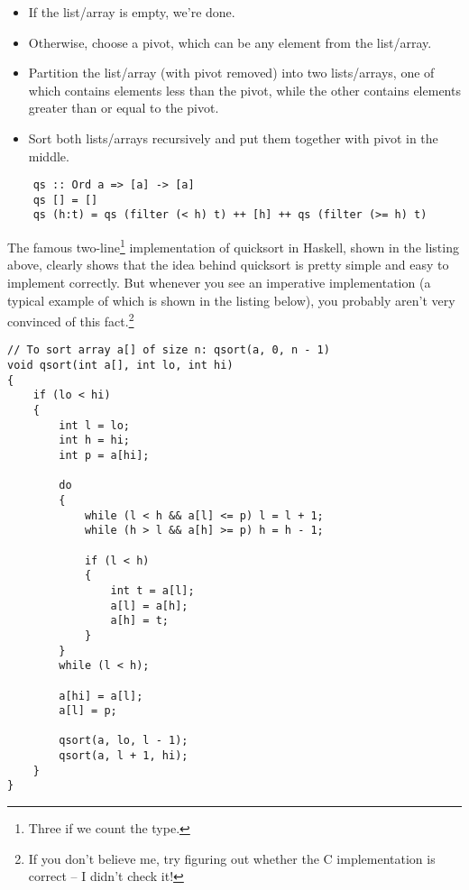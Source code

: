 \documentclass[declaration,mgr,english,shortabstract]{iithesis}
\begin{document}
\begin{itemize}
    \item If the list/array is empty, we're done.
    \item Otherwise, choose a pivot, which can be any element from the list/array.
    \item Partition the list/array (with pivot removed) into two lists/arrays, one of which contains elements less than the pivot, while the other contains elements greater than or equal to the pivot.
    \item Sort both lists/arrays recursively and put them together with pivot in the middle.
\end{itemize}

\begin{verbatim}
    qs :: Ord a => [a] -> [a]
    qs [] = []
    qs (h:t) = qs (filter (< h) t) ++ [h] ++ qs (filter (>= h) t)
\end{verbatim}

The famous two-line\footnote{Three if we count the type.} implementation of quicksort in Haskell, shown in the listing above, clearly shows that the idea behind quicksort is pretty simple and easy to implement correctly. But whenever you see an imperative implementation (a typical example of which is shown in the listing below), you probably aren't very convinced of this fact.\footnote{If you don't believe me, try figuring out whether the C implementation is correct -- I didn't check it!}

\begin{verbatim}
// To sort array a[] of size n: qsort(a, 0, n - 1)
void qsort(int a[], int lo, int hi)
{
    if (lo < hi)
    {
        int l = lo;
        int h = hi;
        int p = a[hi];

        do
        {
            while (l < h && a[l] <= p) l = l + 1;
            while (h > l && a[h] >= p) h = h - 1;

            if (l < h)
            {
                int t = a[l];
                a[l] = a[h];
                a[h] = t;
            }
        }
        while (l < h);

        a[hi] = a[l];
        a[l] = p;

        qsort(a, lo, l - 1);
        qsort(a, l + 1, hi);
    }
}
\end{verbatim}
\end{document}
